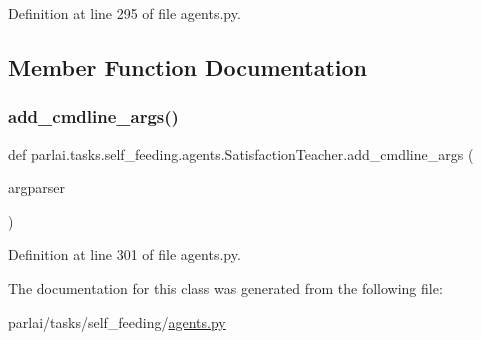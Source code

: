 Definition at line 295 of file agents.\+py.



\subsection{Member Function Documentation}
\mbox{\label{classparlai_1_1tasks_1_1self__feeding_1_1agents_1_1SatisfactionTeacher_a600955877888a602a2d83396248bde1a}} 
\subsubsection{\texorpdfstring{add\+\_\+cmdline\+\_\+args()}{add\_cmdline\_args()}}
{\footnotesize\ttfamily def parlai.\+tasks.\+self\+\_\+feeding.\+agents.\+Satisfaction\+Teacher.\+add\+\_\+cmdline\+\_\+args (\begin{DoxyParamCaption}\item[{}]{argparser }\end{DoxyParamCaption})\hspace{0.3cm}{\ttfamily [static]}}



Definition at line 301 of file agents.\+py.



The documentation for this class was generated from the following file\+:\begin{DoxyCompactItemize}
\item 
parlai/tasks/self\+\_\+feeding/\hyperlink{parlai_2tasks_2self__feeding_2agents_8py}{agents.\+py}\end{DoxyCompactItemize}
